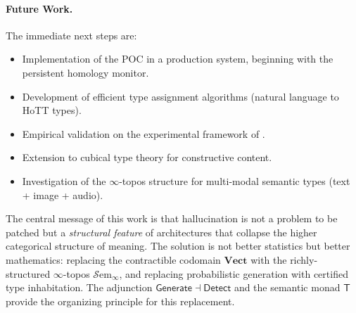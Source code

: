 \documentclass[11pt,a4paper]{article}
\theoremstyle{plain}
\theoremstyle{definition}
\theoremstyle{remark}
\newcommand{\Vect}{\mathbf{Vect}}
\newcommand{\Detect}{\mathsf{Detect}}
\newcommand{\Generate}{\mathsf{Generate}}
\newcommand{\SemanticT}{\mathsf{T}}
\begin{document}
\paragraph{Future Work.} The immediate next steps are:
\begin{itemize}[nosep]
  \item Implementation of the POC in a production system, beginning with the persistent homology monitor.
  \item Development of efficient type assignment algorithms (natural language to HoTT types).
  \item Empirical validation on the experimental framework of .
  \item Extension to cubical type theory for constructive content.
  \item Investigation of the $\infty$-topos structure for multi-modal semantic types (text + image + audio).
\end{itemize}

The central message of this work is that hallucination is not a problem to be patched but a \emph{structural feature} of architectures that collapse the higher categorical structure of meaning. The solution is not better statistics but better mathematics: replacing the contractible codomain $\Vect$ with the richly-structured $\infty$-topos $\mathcal{S}\mathrm{em}_\infty$, and replacing probabilistic generation with certified type inhabitation. The adjunction $\Generate \dashv \Detect$ and the semantic monad $\SemanticT$ provide the organizing principle for this replacement.
\end{document}
